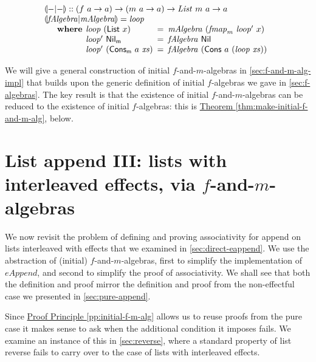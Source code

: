 \documentclass{jfp1}
\newcommand{\eFold}[2]{\llparenthesis #1|#2 \rrparenthesis}
\newcommand{\proofprinref}[1]{\hyperref[#1]{Proof Principle \ref*{#1}}}
\newcommand{\thmref}[1]{\hyperref[#1]{Theorem \ref*{#1}}}
\newcommand{\kw}[1]{\textbf{#1}}
\begin{document}
\begin{displaymath}
  \begin{array}{l}
    \eFold{-}{-} :: (f~a \to a) \to (m~a \to a) \to \mathit{List}~m~a \to a \\
    \eFold{\mathit{fAlgebra}}{\mathit{mAlgebra}} = \mathit{loop} \\
    \quad\begin{array}{r@{\hspace{0.4em}}l@{\hspace{0.5em}}c@{\hspace{0.5em}}l}
      \kw{where} & \mathit{loop}~(\mathsf{List}~x) &=& \mathit{mAlgebra}~(\mathit{fmap}_m~\mathit{loop'}~x) \\
      & \mathit{loop'}~\mathsf{Nil_m}& = & \mathit{fAlgebra}~\mathsf{Nil} \\
      & \mathit{loop'}~(\mathsf{Cons_m}~a~\mathit{xs}) &=& \mathit{fAlgebra}~(\mathsf{Cons}~a~(\mathit{loop}~\mathit{xs}))
    \end{array}
  \end{array}
\end{displaymath}

We will give a general construction of initial $f$-and-$m$-algebras in
\autoref{sec:f-and-m-alg-impl} that builds upon the generic definition
of initial $f$-algebras we gave in \autoref{sec:f-algebras}. The key
result is that the existence of initial $f$-and-$m$-algebras can be
reduced to the existence of initial $f$-algebras: this is
\thmref{thm:make-initial-f-and-m-alg}, below.

\section{List append III: lists with interleaved effects, via $f$-and-$m$-algebras}
\label{sec:f-and-m-append}

We now revisit the problem of defining and proving associativity for
append on lists interleaved with effects that we examined in
\autoref{sec:direct-eappend}. We use the abstraction of (initial)
$f$-and-$m$-algebras, first to simplify the implementation of
$\mathit{eAppend}$, and second to simplify the proof of
associativity. We shall see that both the definition and proof mirror
the definition and proof from the non-effectful case we presented in
\autoref{sec:pure-append}.

Since \proofprinref{pp:initial-f-m-alg} allows us to reuse proofs from
the pure case it makes sense to ask when the additional condition it
imposes fails. We examine an instance of this in
\autoref{sec:reverse}, where a standard property of list reverse fails
to carry over to the case of lists with interleaved effects.
\end{document}
